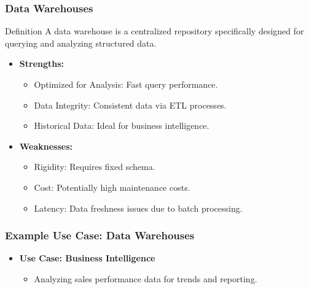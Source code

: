 \documentclass[aspectratio=169]{beamer}
\begin{document}
\begin{frame}[fragile]
    \frametitle{Data Warehouses}
    \begin{block}{Definition}
        A data warehouse is a centralized repository specifically designed for querying and analyzing structured data.
    \end{block}
    \begin{itemize}
        \item \textbf{Strengths:}
            \begin{itemize}
                \item Optimized for Analysis: Fast query performance.
                \item Data Integrity: Consistent data via ETL processes.
                \item Historical Data: Ideal for business intelligence.
            \end{itemize}
        \item \textbf{Weaknesses:}
            \begin{itemize}
                \item Rigidity: Requires fixed schema.
                \item Cost: Potentially high maintenance costs.
                \item Latency: Data freshness issues due to batch processing.
            \end{itemize}
    \end{itemize}
\end{frame}

\begin{frame}[fragile]
    \frametitle{Example Use Case: Data Warehouses}
    \begin{itemize}
        \item \textbf{Use Case: Business Intelligence}
            \begin{itemize}
                \item Analyzing sales performance data for trends and reporting.
            \end{itemize}
    \end{itemize}
\end{frame}
\end{document}
